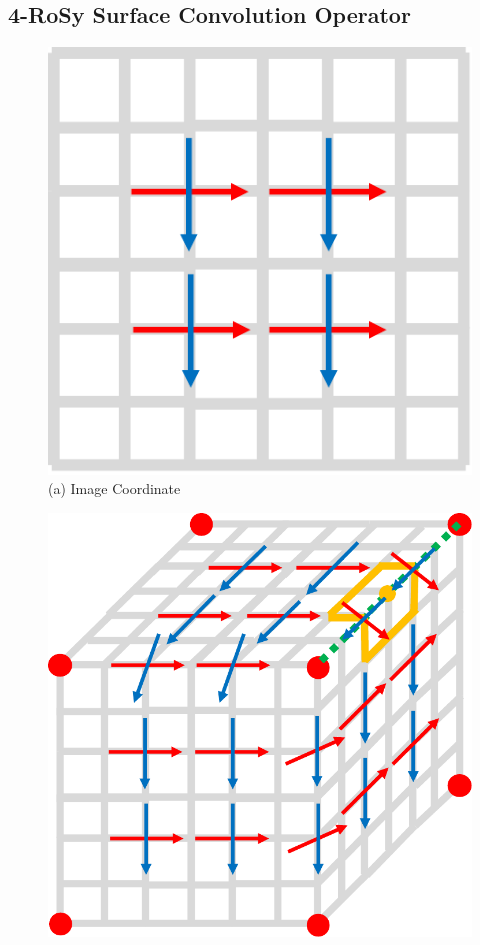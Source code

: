 \subsection{4-RoSy Surface Convolution Operator}
\label{sec:texturenet-approach-conv}
\begin{figure}
     \centering
     \begin{minipage}{0.32\linewidth}
     \centering
     \includegraphics[width=\linewidth,height=\linewidth]{texturenet/diagram/image_coordinate.pdf}\\
     \footnotesize{
     (a) Image Coordinate
     }
     \end{minipage}
     \begin{minipage}{0.32\linewidth}
     \centering
     \includegraphics[width=\linewidth,height=\linewidth]{texturenet/diagram/cube_coordinate.pdf}\\

\end{minipage}
\end{figure}
